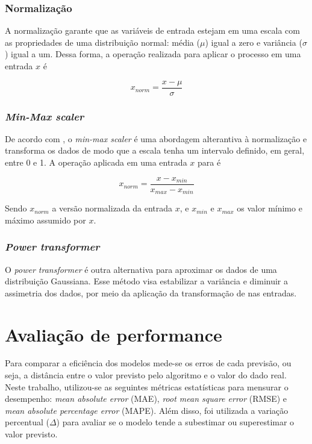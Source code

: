\subsubsection{Normalização}

A normalização garante que as variáveis de entrada estejam em uma 
escala com as propriedades de uma distribuição normal: média ($\mu$)
igual a zero e variância ($\sigma$) igual a um. Dessa forma, a operação 
realizada para aplicar o processo em uma entrada $x$ é

\begin{equation}
  x_{norm} = \frac{x - \mu}{\sigma}
\end{equation}

\subsubsection{\textit{Min-Max scaler}}

De acordo com \citet{Raschka}, o \textit{min-max scaler} é uma 
abordagem alterantiva à normalização 
e transforma os dados de modo que a 
escala tenha um intervalo definido, em geral, entre
0 e 1. A operação aplicada em uma entrada $x$ para é

\begin{equation}
  x_{norm} = \frac{x - x_{min}}{x_{max} - x_{min}}
\end{equation}

Sendo $x_{norm}$ a versão normalizada da entrada $x$, e $x_{min}$ e $x_{max}$
os valor mínimo e máximo assumido por $x$. 

\subsubsection{\textit{Power transformer}}

O \textit{power transformer} é outra alternativa para aproximar os dados 
de uma distribuição Gaussiana. Esse método visa estabilizar a variância e 
diminuir a assimetria dos dados, por meio da aplicação da 
transformação de \citet{yeo} nas entradas. 


\section{Avaliação de performance}

Para comparar a eficiência dos modelos mede-se os erros de 
cada previsão, ou seja, a distância entre o valor previsto 
pelo algoritmo e o valor do dado real. Neste trabalho, 
utilizou-se as seguintes métricas estatísticas para 
mensurar o desempenho: \textit{mean absolute error} (MAE),
\textit{root mean square  error} (RMSE) e \textit{mean 
absolute percentage error} (MAPE). Além disso, foi utilizada
a variação percentual ($\Delta$) para avaliar se o modelo tende 
a subestimar ou superestimar o valor previsto.

